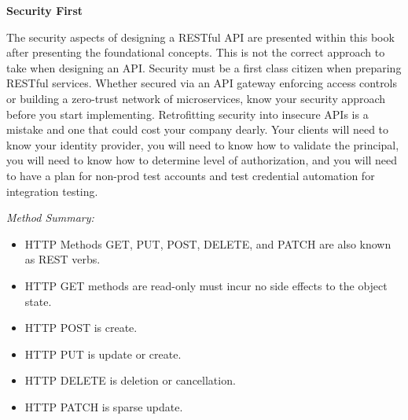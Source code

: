 \begin{minipage}{\linewidth}
\begin{sidebar}
\begin{center}
\textbf{Security First}
\end{center}

The security aspects of designing a RESTful API are presented within this book after presenting the foundational concepts.  This is not the correct approach to take when designing an API.  Security must be a first class citizen when preparing RESTful services.  Whether secured via an API gateway enforcing access controls or building a zero-trust network of microservices, know your security approach before you start implementing.  Retrofitting security into insecure APIs is a mistake and one that could cost your company dearly.  Your clients will need to know your identity provider, you will need to know how to validate the principal, you will need to know how to determine level of authorization, and you will need to have a plan for non-prod test accounts and test credential automation for integration testing.

\end{sidebar}
\end{minipage}

\emph{Method Summary:}

\begin{itemize}
  \item HTTP Methods GET, PUT, POST, DELETE, and PATCH are also known as REST verbs.
  \item HTTP GET methods are read-only must incur no side effects to the object state.
  \item HTTP POST is create.
  \item HTTP PUT is update or create.
  \item HTTP DELETE is deletion or cancellation.
  \item HTTP PATCH is sparse update.
\end{itemize}
